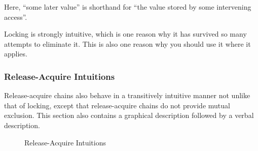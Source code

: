 Here, ``some later value'' is shorthand for ``the value stored by some
intervening access''.

\QuickQuizEnd

Locking is strongly intuitive, which is one reason why it has survived
so many attempts to eliminate it.
This is also one reason why you should use it where it applies.

\subsubsection{Release-Acquire Intuitions}
\label{sec:memorder:Release-Acquire Intuitions}

Release-acquire chains also behave in a transitively intuitive manner
not unlike that of locking, except that release-acquire chains do not
provide mutual exclusion.
This section also contains a graphical description followed by a verbal
description.

\begin{figure}
\centering
{}
\caption{Release-Acquire Intuitions}
\label{fig:memorder:Release-Acquire Intuitions}
\end{figure}


